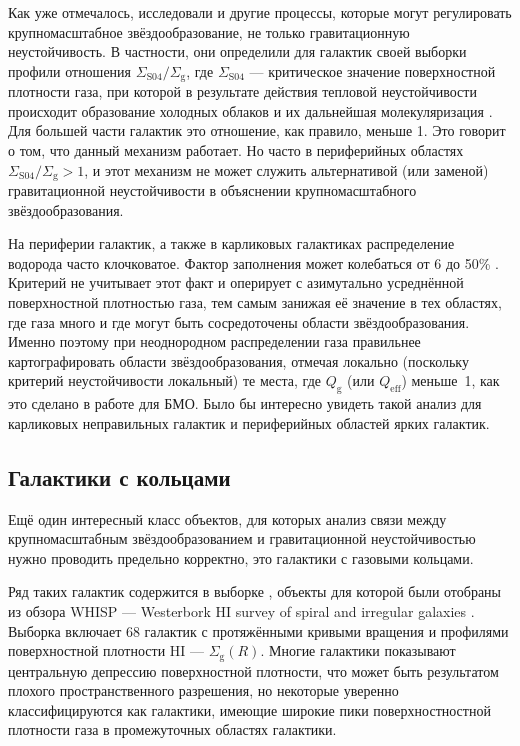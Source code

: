 \documentclass[russian,12pt]{article}
\begin{document}
Как уже отмечалось, \cite{Leroy+08} исследовали и другие процессы, 
которые могут регулировать крупномасштабное звёздообразование, не 
только гравитационную неустойчивость. В частности, они определили для 
галактик своей выборки профили отношения 
$\Sigma_\mathrm{S04}/\Sigma_\mathrm{g}$, где $\Sigma_\mathrm{S04}$ --- 
критическое значение поверхностной плотности газа, при которой в 
результате действия тепловой неустойчивости происходит образование 
холодных облаков и их дальнейшая молекуляризация \citep{Schaye04}. Для 
большей части галактик это отношение, как правило, меньше 1. Это 
говорит о том, что данный механизм работает. Но часто в периферийных 
областях $\Sigma_\mathrm{S04}/\Sigma_\mathrm{g} > 1$, и этот механизм 
не может служить альтернативой (или заменой) гравитационной неустойчивости 
в объяснении крупномасштабного звёздообразования.

На периферии галактик, а также в карликовых галактиках распределение 
водорода часто клочковатое. Фактор заполнения может колебаться от 6 до 
50\% \citep{Braun97}. Критерий \cite{Kennicutt89} не учитывает этот 
факт и оперирует с азимутально усреднённой поверхностной плотностью 
газа, тем самым занижая её значение в тех областях, где газа много и 
где могут быть сосредоточены области звёздообразования. Именно поэтому 
при неоднородном распределении газа правильнее картографировать области 
звёздообразования, отмечая локально (поскольку критерий неустойчивости 
локальный) те места, где $Q_\mathrm{g}$ (или $Q_\mathrm{eff}$) меньше~1, 
как это сделано в работе \cite{Yang+07} для БМО. Было бы интересно 
увидеть такой анализ для карликовых неправильных галактик и периферийных 
областей ярких галактик.

\subsection{Галактики с кольцами}

Ещё один интересный класс объектов, для которых анализ связи между 
крупномасштабным звёздообразованием и гравитационной неустойчивостью 
нужно проводить предельно корректно, это галактики с газовыми кольцами. 

Ряд таких галактик содержится в выборке \cite{Noordermeer+05}, 
объекты для которой были отобраны из обзора WHISP --- 
Westerbork HI survey of spiral and irregular galaxies 
\citep{Kamphius+96,vanderHulst+01}. Выборка \cite{Noordermeer+05} включает 
68 галактик с протяжёнными кривыми вращения и профилями поверхностной 
плотности HI --- $\Sigma_\mathrm{g}(R)$. Многие галактики показывают 
центральную депрессию поверхностной плотности, что может быть 
результатом плохого пространственного разрешения, но некоторые уверенно 
классифицируются как галактики, имеющие широкие пики поверхностностной 
плотности газа в промежуточных областях галактики.
\end{document}
